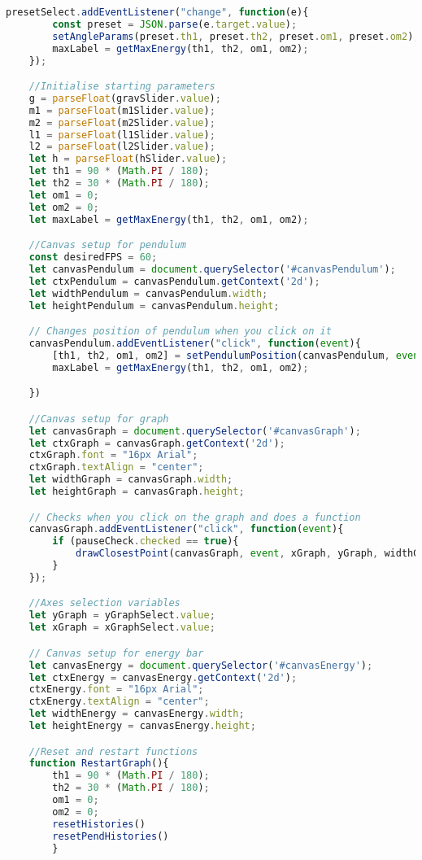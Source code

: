 \documentclass[12pt]{article}
\begin{document}
\begin{lstlisting}[language=JavaScript]
    presetSelect.addEventListener("change", function(e){
        const preset = JSON.parse(e.target.value);
        setAngleParams(preset.th1, preset.th2, preset.om1, preset.om2);
        maxLabel = getMaxEnergy(th1, th2, om1, om2);
    });

    //Initialise starting parameters
    g = parseFloat(gravSlider.value);
    m1 = parseFloat(m1Slider.value);
    m2 = parseFloat(m2Slider.value);
    l1 = parseFloat(l1Slider.value);
    l2 = parseFloat(l2Slider.value);
    let h = parseFloat(hSlider.value);
    let th1 = 90 * (Math.PI / 180);
    let th2 = 30 * (Math.PI / 180);
    let om1 = 0;
    let om2 = 0;
    let maxLabel = getMaxEnergy(th1, th2, om1, om2);

    //Canvas setup for pendulum
    const desiredFPS = 60;
    let canvasPendulum = document.querySelector('#canvasPendulum');
    let ctxPendulum = canvasPendulum.getContext('2d');
    let widthPendulum = canvasPendulum.width;
    let heightPendulum = canvasPendulum.height;

    // Changes position of pendulum when you click on it
    canvasPendulum.addEventListener("click", function(event){
        [th1, th2, om1, om2] = setPendulumPosition(canvasPendulum, event, om1, om2);
        maxLabel = getMaxEnergy(th1, th2, om1, om2);

    })

    //Canvas setup for graph
    let canvasGraph = document.querySelector('#canvasGraph');
    let ctxGraph = canvasGraph.getContext('2d');
    ctxGraph.font = "16px Arial";
    ctxGraph.textAlign = "center";
    let widthGraph = canvasGraph.width;
    let heightGraph = canvasGraph.height;

    // Checks when you click on the graph and does a function
    canvasGraph.addEventListener("click", function(event){
        if (pauseCheck.checked == true){
            drawClosestPoint(canvasGraph, event, xGraph, yGraph, widthGraph, heightGraph);
        } 
    });

    //Axes selection variables
    let yGraph = yGraphSelect.value;
    let xGraph = xGraphSelect.value;

    // Canvas setup for energy bar
    let canvasEnergy = document.querySelector('#canvasEnergy');
    let ctxEnergy = canvasEnergy.getContext('2d');
    ctxEnergy.font = "16px Arial";
    ctxEnergy.textAlign = "center";
    let widthEnergy = canvasEnergy.width;
    let heightEnergy = canvasEnergy.height;

    //Reset and restart functions
    function RestartGraph(){
        th1 = 90 * (Math.PI / 180);
        th2 = 30 * (Math.PI / 180);
        om1 = 0;
        om2 = 0;
        resetHistories()
        resetPendHistories()
        }


\end{lstlisting}
\end{document}
